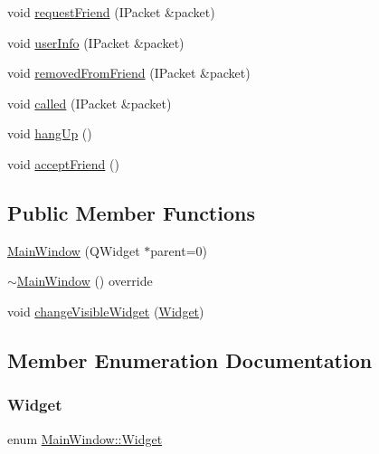 \begin{DoxyCompactItemize}
\item 
void \mbox{\hyperlink{classMainWindow_a739f0fac2fc2f546756d2285e4fe9ddb}{request\+Friend}} (I\+Packet \&packet)
\item 
void \mbox{\hyperlink{classMainWindow_a2acb29717b28598ed004b381d0c5cb8a}{user\+Info}} (I\+Packet \&packet)
\item 
void \mbox{\hyperlink{classMainWindow_a2291b360d17ee3ccdb90a05ceaea45ed}{removed\+From\+Friend}} (I\+Packet \&packet)
\item 
void \mbox{\hyperlink{classMainWindow_a8e527dafdb7cbd2c404e5f29bbecf40a}{called}} (I\+Packet \&packet)
\item 
void \mbox{\hyperlink{classMainWindow_a7d0e1db436a81d7bccca2a8dffb0cb9e}{hang\+Up}} ()
\item 
void \mbox{\hyperlink{classMainWindow_af71d1efd326645c39792a7731451b207}{accept\+Friend}} ()
\end{DoxyCompactItemize}
\subsection*{Public Member Functions}
\begin{DoxyCompactItemize}
\item 
\mbox{\hyperlink{classMainWindow_a8b244be8b7b7db1b08de2a2acb9409db}{Main\+Window}} (Q\+Widget $\ast$parent=0)
\item 
\mbox{\hyperlink{classMainWindow_a1f7d2c56410fc1bfa135bb907d43313f}{$\sim$\+Main\+Window}} () override
\item 
void \mbox{\hyperlink{classMainWindow_a3cb8372306825d0b28040bd7c9f4d6bc}{change\+Visible\+Widget}} (\mbox{\hyperlink{classMainWindow_a44e53650a12325d1ad0625dbf1ef7d98}{Widget}})
\end{DoxyCompactItemize}


\subsection{Member Enumeration Documentation}
\mbox{\label{classMainWindow_a44e53650a12325d1ad0625dbf1ef7d98}} 
\subsubsection{\texorpdfstring{Widget}{Widget}}
{\footnotesize\ttfamily enum \mbox{\hyperlink{classMainWindow_a44e53650a12325d1ad0625dbf1ef7d98}{Main\+Window\+::\+Widget}}}

